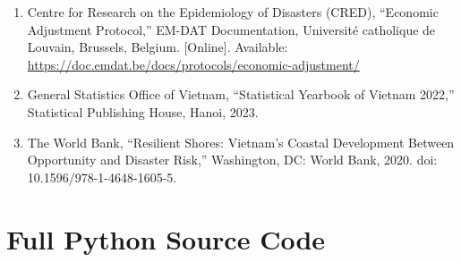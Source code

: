 \documentclass[12pt, a4paper]{report}
\begin{document}
\begin{enumerate}
    \item Centre for Research on the Epidemiology of Disasters (CRED), ``Economic Adjustment Protocol,'' EM-DAT Documentation, Université catholique de Louvain, Brussels, Belgium. [Online]. Available: \url{https://doc.emdat.be/docs/protocols/economic-adjustment/}
    \item General Statistics Office of Vietnam, ``Statistical Yearbook of Vietnam 2022,'' Statistical Publishing House, Hanoi, 2023.
    \item The World Bank, ``Resilient Shores: Vietnam's Coastal Development Between Opportunity and Disaster Risk,'' Washington, DC: World Bank, 2020. doi: 10.1596/978-1-4648-1605-5.
\end{enumerate}

\appendix
\chapter{Full Python Source Code}
\label{appendix:code}
\end{document}

